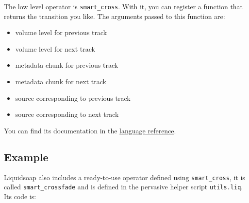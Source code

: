 The low level operator is \verb+smart_cross+. With it, you can register a function that returns the transition you like. The arguments passed to this function are:

\begin{itemize}
\item volume level for previous track
\item volume level for next track
\item metadata chunk for previous track
\item metadata chunk for next track
\item source corresponding to previous track
\item source corresponding to next track

\end{itemize}
You can find its documentation in the \href{reference.html}{language reference}.

\subsection{Example}
Liquidsoap also includes a ready-to-use operator defined using
\verb+smart_cross+, it is called \verb+smart_crossfade+ and is defined in the
pervasive helper script \verb+utils.liq+. Its code is:

